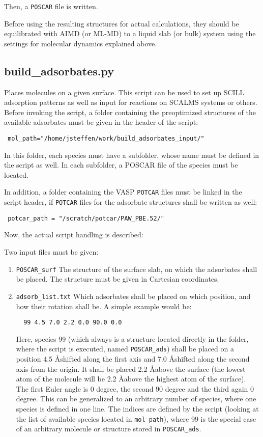 \documentclass[a4paper,11pt]{article}
\begin{document}
Then, a \texttt{POSCAR} file is written.

Before using the resulting structures for actual calculations, they should be 
equilibrated with AIMD (or ML-MD) to a liquid slab (or bulk) system using the 
settings for molecular dynamics explained above.

\subsection{build\_adsorbates.py}\label{build_adsorbates}

Places molecules on a given surface. This script can be used to set up
SCILL adsorption patterns as well as input for reactions on SCALMS systems or others.
Before invoking the script, a folder containing the preoptimized structures
of the available adsorbates must be given in the header of the script:

\begin{verbatim}
 mol_path="/home/jsteffen/work/build_adsorbates_input/"
\end{verbatim}

In this folder, each species must have a subfolder, whose name must be defined
in the script as well. In each subfolder, a POSCAR file of the species must be
located.

In addition, a folder containing the VASP \texttt{POTCAR} files must be linked
in the script header, if \texttt{POTCAR} files for the adsorbate structures
shall be written as well:

\begin{verbatim}
 potcar_path = "/scratch/potcar/PAW_PBE.52/"
\end{verbatim}

Now, the actual script handling is described:

Two input files must be given:
\begin{enumerate}
 \item \texttt{POSCAR\_surf} The structure of the surface slab, on which the
 adsorbates shall be placed. The structure must be given in Cartesian coordinates.
 \item \texttt{adsorb\_list.txt} Which adsorbates shall be placed on which position,
 and how their rotation shall be.
 A simple example would be:
 \begin{verbatim}
  99 4.5 7.0 2.2 0.0 90.0 0.0
 \end{verbatim}
 Here, species 99 (which always is a structure located directly in the folder, where
 the script is executed, named \texttt{POSCAR\_ads}) shall be placed on a position
 4.5 \AA shifted along the first axis and 7.0 \AA shifted along the second axis
 from the origin. It shall be placed 2.2 \AA above the surface (the lowest atom of the
 molecule will be 2.2 \AA above the highest atom of the surface).
 The first Euler angle is 0 degree, the second 90 degree and the third again 0 degree.
 This can be generalized to an arbitrary number of species, where one species is
 defined in one line. The indices are defined by the script (looking at the list of
 available species located in \texttt{mol\_path}), where 99 is the
 special case of an arbitrary molecule or structure stored in \texttt{POSCAR\_ads}.
 \end{enumerate}
\end{document}
